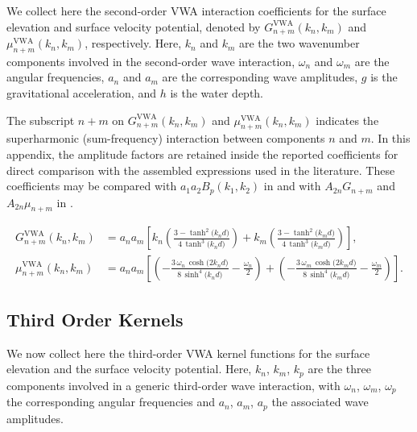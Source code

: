 \documentclass[lineno]{JFM-FLM_Au}
\begin{document}
\begin{appen}
We collect here the second-order VWA interaction coefficients for the surface elevation and surface velocity potential, denoted by $G_{n+m}^{\mathrm{VWA}}(k_n,k_m)$ and $\mu_{n+m}^{\mathrm{VWA}}(k_n,k_m)$, respectively. Here, $k_n$ and $k_m$ are the two wavenumber components involved in the second-order wave interaction, $\omega_n$ and $\omega_m$ are the angular frequencies, $a_n$ and $a_m$ are the corresponding wave amplitudes, $g$ is the gravitational acceleration, and $h$ is the water depth. 

The subscript $n+m$ on $G_{n+m}^{\mathrm{VWA}}(k_n,k_m)$ and $\mu_{n+m}^{\mathrm{VWA}}(k_n,k_m)$ indicates the superharmonic (sum-frequency) interaction between components $n$ and $m$. In this appendix, the amplitude factors are retained inside the reported coefficients for direct comparison with the assembled expressions used in the literature. These coefficients may be compared with $a_1 a_2 B_p(k_1,k_2)$ in \cite{dalzell1999note} and with $A_{2n}G_{n+m}$ and $A_{2n}\mu_{n+m}$ in \cite{madsen2006third,madsen2012third}.

\begin{subequations}
\label{eq:VWA-kernels}
\begin{align}
  G_{n+m}^{\mathrm{VWA}}(k_n,k_m)
  &= a_n a_m
  \left[
    k_n \left(
      \frac{3 - \tanh^{2}\!\bigl(k_n d\bigr)}
           {4\,\tanh^{3}\!\bigl(k_n d\bigr)}
    \right)
    +
    k_m \left(
      \frac{3 - \tanh^{2}\!\bigl(k_m d\bigr)}
           {4\,\tanh^{3}\!\bigl(k_m d\bigr)}
    \right)
  \right],
  \label{eq:VWA-G}
\\
\mu_{n+m}^{\mathrm{VWA}}(k_n,k_m)
  &= a_n a_m
  \left[
    \left(
      -\frac{3\,\omega_n\,\cosh\!\bigl(2 k_n d\bigr)}
            {8\,\sinh^{4}\!\bigl(k_n d\bigr)}
      -\frac{\omega_n}{2}
    \right)
    +
    \left(
      -\frac{3\,\omega_m\,\cosh\!\bigl(2 k_m d\bigr)}
            {8\,\sinh^{4}\!\bigl(k_m d\bigr)}
      -\frac{\omega_m}{2}
    \right)
  \right].
  \label{eq:VWA-mu}
\end{align}
\end{subequations}


\subsection{Third Order Kernels}
We now collect here the third-order VWA kernel functions for the surface elevation and the surface velocity potential. Here, $k_n$, $k_m$, $k_p$ are the three components involved in a generic third-order
wave interaction, with $\omega_n$, $\omega_m$, $\omega_p$ the corresponding angular frequencies and $a_n$, $a_m$, $a_p$
the associated wave amplitudes.



\end{appen}
\end{document}
